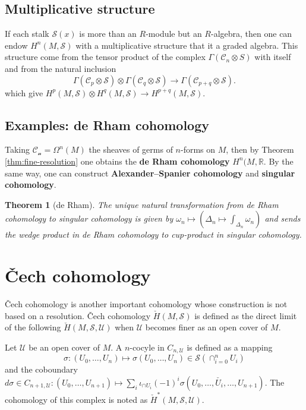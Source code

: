 \documentclass[11pt]{article}
\newtheorem{theorem}{Theorem}
\begin{document}
\subsection{Multiplicative structure}
\label{sec:org6a55a77}

If each stalk \(\mathcal{S}(x)\) is more than an \(R\)-module but an \(R\)-algebra, then one can endow \(H^n(M, \mathcal{S})\) with a multiplicative structure
that it a graded algebra. This structure come from the tensor product of the complex \(\Gamma(\mathcal{C}_n\otimes S)\) with itself and from the natural inclusion
\[
\Gamma(\mathcal{C}_p\otimes\mathcal{S}) \otimes \Gamma(\mathcal{C}_q\otimes\mathcal{S})
\longrightarrow \Gamma(\mathcal{C}_{p+q} \otimes \mathcal{S}).
\]
which give \(H^p(M,\mathcal{S})\otimes H^q(M, \mathcal{S}) \longrightarrow H^{p+q}(M,
\mathcal{S})\).


\subsection{Examples: de Rham cohomology}
\label{sec:orgbd2adbd}
Taking \(\mathcal{C_n} = \Omega^n(M)\) the sheaves of germs of \(n\)-forms on \(M\), then by Theorem \ref{thm:fine-resolution} one obtains the \textbf{de Rham cohomology} \(H^n(M,
  \mathbb{R}\). By the same way, one can construct \textbf{Alexander–Spanier cohomology} and
\textbf{singular cohomology}.

\begin{theorem}[de Rham]
\label{thm:de-rham-singular}
The unique natural transformation from de Rham cohomology to singular cohomology is given
by \(\omega_n \mapsto \left(\Delta_n \mapsto \int_{\Delta_n}\omega_n \right)\) and sends
the wedge product in de Rham cohomology to cup-product in singular cohomology.
\end{theorem}

\section{Čech cohomology}
\label{sec:org91022b2}
Čech cohomology is another important cohomology whose construction is not based on a
resolution. Čech cohomology \(\check{H}(M, \mathcal{S})\) is defined as the direct limit
of the following \(\check{H}(M,\mathcal{S},\mathcal{U})\) when \(\mathcal{U}\) becomes
finer as an open cover of \(M\).

Let \(\mathcal{U}\) be an open cover of \(M\). A \(n\)-cocyle in \(C_{n,\mathcal{U}}\) is defined as a
mapping 
\[ 
\sigma: (U_0,\dots, U_n) \mapsto \sigma(U_0,\dots, U_n) \in \mathcal{S}\left(\cap_{i=0}^n
U_i\right)
\]
and the coboundary \(d\sigma \in C_{n+1,\mathcal{U}} : (U_0,\dots, U_{n+1}) \mapsto
\sum_i \iota_{\cap U_i}(-1)^i
\sigma (U_0,\dots,\check{U_i},\dots, U_{n+1})\). The cohomology of this complex is noted
as \(\check{H}^*(M, \mathcal{S},\mathcal{U})\).
\end{document}
